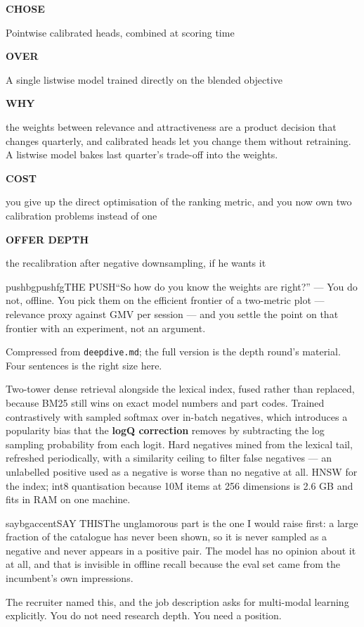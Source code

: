 \documentclass[10pt,twoside]{book}
\makeatletter
\newcommand{\csection}[1]{\par\vspace{13pt}\noindent{\sffamily\large\bfseries\color{ink}\raggedright #1\par}\vspace{4pt}}
\newenvironment{calloutsay}{\begin{co@box}{saybg}{accent}{SAY THIS}}{\end{co@box}}
\newenvironment{calloutpush}{\begin{co@box}{pushbg}{pushfg}{THE PUSH}}{\end{co@box}}
\newenvironment{decide}[1]{%
  \par\smallskip\noindent
  \begin{tcolorbox}[colback=white,colframe=accent,boxrule=1pt,arc=3pt,
    left=8pt,right=8pt,top=6pt,bottom=5pt,
    title={\sffamily\bfseries\small #1},coltitle=white,colbacktitle=accent,
    fonttitle=\sffamily]%
  \small%
}{\end{tcolorbox}\par\smallskip}
\newcommand{\drow}[2]{%
  \par\noindent
  \begin{minipage}[t]{58pt}\raggedright\strut
    {\sffamily\bfseries\scriptsize\color{accent}#1}\end{minipage}%
  \hspace{6pt}%
  \begin{minipage}[t]{\dimexpr\linewidth-64pt\relax}\strut #2\end{minipage}%
  \par\vspace{3.5pt}}
\makeatother
\begin{document}
\begin{decide}{Pointwise or listwise for a multi-objective ranker?}
\drow{CHOSE}{Pointwise calibrated heads, combined at scoring time}
\drow{OVER}{A single listwise model trained directly on the blended objective}
\drow{WHY}{the weights between relevance and attractiveness are a product decision that changes quarterly, and calibrated heads let you change them without retraining. A listwise model bakes last quarter's trade-off into the weights.}
\drow{COST}{you give up the direct optimisation of the ranking metric, and you now own two calibration problems instead of one}
\drow{OFFER DEPTH}{the recalibration after negative downsampling, if he wants it}
\end{decide}
\begin{calloutpush}``So how do you know the weights are right?'' --- You do not, offline. You pick them on the efficient frontier of a two-metric plot --- relevance proxy against GMV per session --- and you settle the point on that frontier with an experiment, not an argument.\end{calloutpush}
\csection{Retrieval}
Compressed from \texttt{deepdive.md}; the full version is the depth round's material. Four sentences is the right size here.\par
Two-tower dense retrieval alongside the lexical index, fused rather than replaced, because BM25 still wins on exact model numbers and part codes. Trained contrastively with sampled softmax over in-batch negatives, which introduces a popularity bias that the \textbf{logQ correction} removes by subtracting the log sampling probability from each logit. Hard negatives mined from the lexical tail, refreshed periodically, with a similarity ceiling to filter false negatives --- an unlabelled positive used as a negative is worse than no negative at all. HNSW for the index; int8 quantisation because 10M items at 256 dimensions is 2.6 GB and fits in RAM on one machine.\par
\begin{calloutsay}The unglamorous part is the one I would raise first: a large fraction of the catalogue has never been shown, so it is never sampled as a negative and never appears in a positive pair. The model has no opinion about it at all, and that is invisible in offline recall because the eval set came from the incumbent's own impressions.\end{calloutsay}
\csection{Computer vision and multimodal}
The recruiter named this, and the job description asks for multi-modal learning explicitly. You do not need research depth. You need a position.\par
\end{document}
